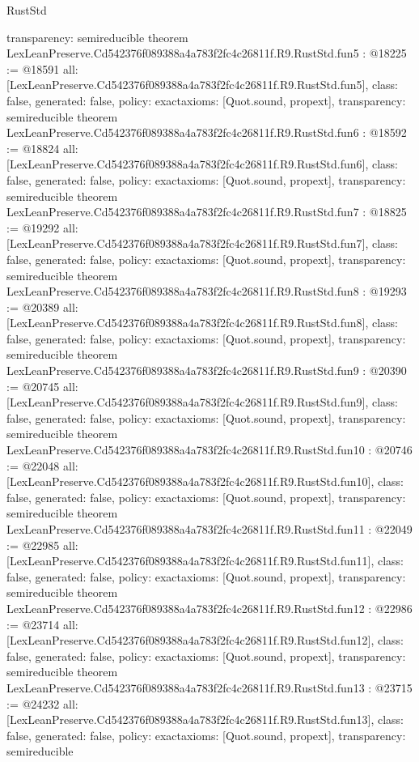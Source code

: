 \begin{lexlean}{RustStd}
\begin{coremodule}
{  transparency: semireducible
}
theorem LexLeanPreserve.Cd542376f089388a4a783f2fc4c26811f.R9.RustStd.fun5 : @18225 := @18591 {
  all: [LexLeanPreserve.Cd542376f089388a4a783f2fc4c26811f.R9.RustStd.fun5],
  class: false,
  generated: false,
  policy: exact{axioms: [Quot.sound, propext]},
  transparency: semireducible
}
theorem LexLeanPreserve.Cd542376f089388a4a783f2fc4c26811f.R9.RustStd.fun6 : @18592 := @18824 {
  all: [LexLeanPreserve.Cd542376f089388a4a783f2fc4c26811f.R9.RustStd.fun6],
  class: false,
  generated: false,
  policy: exact{axioms: [Quot.sound, propext]},
  transparency: semireducible
}
theorem LexLeanPreserve.Cd542376f089388a4a783f2fc4c26811f.R9.RustStd.fun7 : @18825 := @19292 {
  all: [LexLeanPreserve.Cd542376f089388a4a783f2fc4c26811f.R9.RustStd.fun7],
  class: false,
  generated: false,
  policy: exact{axioms: [Quot.sound, propext]},
  transparency: semireducible
}
theorem LexLeanPreserve.Cd542376f089388a4a783f2fc4c26811f.R9.RustStd.fun8 : @19293 := @20389 {
  all: [LexLeanPreserve.Cd542376f089388a4a783f2fc4c26811f.R9.RustStd.fun8],
  class: false,
  generated: false,
  policy: exact{axioms: [Quot.sound, propext]},
  transparency: semireducible
}
theorem LexLeanPreserve.Cd542376f089388a4a783f2fc4c26811f.R9.RustStd.fun9 : @20390 := @20745 {
  all: [LexLeanPreserve.Cd542376f089388a4a783f2fc4c26811f.R9.RustStd.fun9],
  class: false,
  generated: false,
  policy: exact{axioms: [Quot.sound, propext]},
  transparency: semireducible
}
theorem LexLeanPreserve.Cd542376f089388a4a783f2fc4c26811f.R9.RustStd.fun10 : @20746 := @22048 {
  all: [LexLeanPreserve.Cd542376f089388a4a783f2fc4c26811f.R9.RustStd.fun10],
  class: false,
  generated: false,
  policy: exact{axioms: [Quot.sound, propext]},
  transparency: semireducible
}
theorem LexLeanPreserve.Cd542376f089388a4a783f2fc4c26811f.R9.RustStd.fun11 : @22049 := @22985 {
  all: [LexLeanPreserve.Cd542376f089388a4a783f2fc4c26811f.R9.RustStd.fun11],
  class: false,
  generated: false,
  policy: exact{axioms: [Quot.sound, propext]},
  transparency: semireducible
}
theorem LexLeanPreserve.Cd542376f089388a4a783f2fc4c26811f.R9.RustStd.fun12 : @22986 := @23714 {
  all: [LexLeanPreserve.Cd542376f089388a4a783f2fc4c26811f.R9.RustStd.fun12],
  class: false,
  generated: false,
  policy: exact{axioms: [Quot.sound, propext]},
  transparency: semireducible
}
theorem LexLeanPreserve.Cd542376f089388a4a783f2fc4c26811f.R9.RustStd.fun13 : @23715 := @24232 {
  all: [LexLeanPreserve.Cd542376f089388a4a783f2fc4c26811f.R9.RustStd.fun13],
  class: false,
  generated: false,
  policy: exact{axioms: [Quot.sound, propext]},
  transparency: semireducible
}
\end{coremodule}
\end{lexlean}
